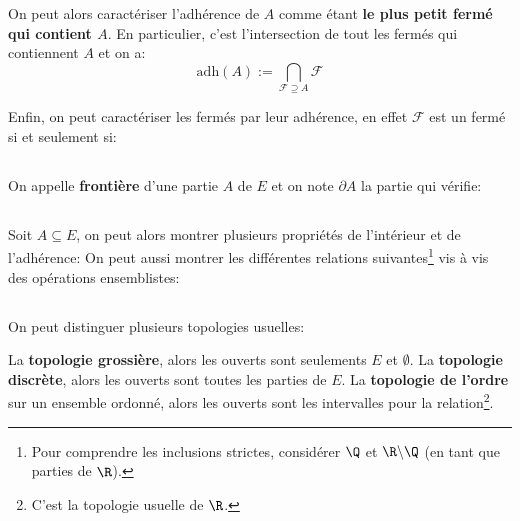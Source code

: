 On peut alors caractériser l'adhérence de \(A\) comme étant \textbf{le plus petit fermé qui contient \(A\)}. En particulier, c'est l'intersection de tout les fermés qui contiennent \(A\) et on a:
\[
    \text{adh}(A) := \bigcap_{\mathcal{F} \supseteq {A}} \mathcal{F}
\]

Enfin, on peut caractériser les fermés par leur adhérence, en effet \(\mathcal{F}\) est un fermé si et seulement si:
\subsection*{}
On appelle \textbf{frontière} d'une partie \(A\) de \(E\) et on note \(\partial A\) la partie qui vérifie:
\subsection*{}
Soit \(A \subseteq E\), on peut alors montrer plusieurs propriétés de l'intérieur et de l'adhérence:
On peut aussi montrer les différentes relations suivantes\footnote[1]{Pour comprendre les inclusions strictes, considérer \(\Q\) et \(\R \backslash \Q\) (en tant que parties de \(\R\)).} vis à vis des opérations ensemblistes:
\subsection*{}
On peut distinguer plusieurs topologies usuelles:\<

La \textbf{topologie grossière}, alors les ouverts sont seulements \(E\) et \(\emptyset\).\+
La \textbf{topologie discrète}, alors les ouverts sont toutes les parties de \(E\).\+
La \textbf{topologie de l'ordre} sur un ensemble ordonné, alors les ouverts sont les intervalles pour la relation\footnote[2]{C'est la topologie usuelle de \(\R\).}. 
